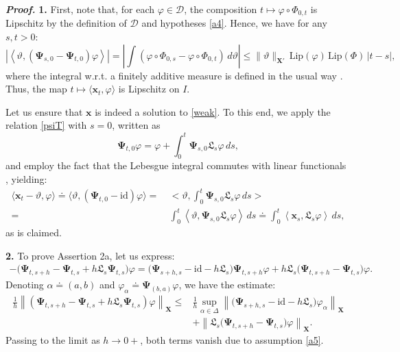 \documentclass[sn-mathphys-num]{sn-jnl}
\numberwithin{equation}{section}
\theoremstyle{mythm}
\theoremstyle{mydef}
\renewenvironment{proof}{\smallskip\noindent\emph{\textbf{Proof.}}%
  \hspace{1pt}}{\hspace{-5pt}{\nobreak\quad\nobreak\hfill\nobreak%
    $\square$\vspace{2pt}\par}\smallskip\goodbreak}
\newcommand{\Lip}{\mathrm{Lip}}
\renewcommand{\phi}{\varphi}
\renewcommand{\d}{\,d}
\newcommand{\id}{\mathrm{id}}
\begin{document}
\begin{proof}
  \textbf{1.} First, note that, for each \( \phi \in \bm{\mathcal D} \), 
 the composition \( t \mapsto \phi \circ \Phi_{0, t} \) is Lipschitz by the definition of \( \bm{\mathcal D} \) and hypotheses \ref{a4}. Hence, we have for any \( s,t > 0 \):
\[
    \left|\left\langle \vartheta, (\bm \Psi_{s,0} - \bm \Psi_{t,0})\phi\right\rangle\right| = \left|\int \left(\phi\circ\Phi_{0,s} - \phi\circ\Phi_{0,t}\right)\d \vartheta\right| \leq \|\vartheta\|_{\bm X'} \, \Lip(\phi) \, \Lip(\Phi)\, |t-s|,
\]
where the integral w.r.t. a finitely additive measure is defined in the usual way \cite[\S 4.7(iv)]{bogachevMeasureTheoryVolume2007a}. Thus, the map \(t \mapsto \langle \bm{x}_t , \phi \rangle\) is Lipschitz on $I$.

Let us ensure that \( \bm x \) is indeed a solution to \eqref{weak}. To this end, we apply the relation \eqref{psiT} with $s=0$, written as
\[
\bm \Psi_{t,0} \phi = \phi + \int_0^t \bm \Psi_{s,0} \mathfrak L_s \phi\d s,
\]  
and employ the fact that the Lebesgue integral commutes with linear functionals \cite[Sec.~8, Propos.~7]{dinculeanu2014vector}, yielding:
\begin{align*}
\langle \bm x_t-  \vartheta, \phi\rangle \doteq \langle\vartheta,(\bm \Psi_{t,0}-\id)\phi \rangle = \ &  \Big< \vartheta, \int_0^t \bm \Psi_{s,0} \mathfrak L_s \phi \d s \Big>\\
 = \  & \int_0^t \left\langle \vartheta, \bm \Psi_{s,0} \mathfrak L_s \phi\right\rangle \d s \doteq \int_0^{t}\left< \bm x_s,  \mathfrak L_s \phi\right> \d s,
\end{align*}
as is claimed.

\smallskip

\textbf{2.} To prove Assertion 2a, let us express:
    \begin{align*}
        -\big(\bm \Psi_{t, s+h} - \bm \Psi_{t,s} + h\mathfrak L_s \bm \Psi_{t,s}\big)\phi = \big(\bm \Psi_{s+h,s}  {-} \id  - h\mathfrak L_s\big)\bm \Psi_{t,s+h}\phi + h\mathfrak L_s \big(\bm \Psi_{t, s+h} - \bm \Psi_{t, s}\big)\phi.
    \end{align*}
   Denoting  $\alpha \doteq (a,b)$ and $\phi_\alpha \doteq \bm \Psi_{(b,a)}\phi$, we have the estimate:
      \begin{align*}
       \frac{1}{h}\left\|(\bm \Psi_{t, s+h} - \bm \Psi_{t,s} + h\mathfrak L_s \bm \Psi_{t,s})\phi\right\|_{\bm X}  \leq & \frac{1}{h}\sup_{\alpha \in \Delta}\left\|\big(\bm \Psi_{s+h,s}  - \id  - h\mathfrak L_s\big)\phi_\alpha\right\|_{\bm X}\\ 
       & +\left\|\mathfrak L_s \big(\bm \Psi_{t, s+h} - \bm \Psi_{t, s}\big)\phi\right\|_{\bm X}.
    \end{align*}
   Passing to the limit as $h \to 0+$, both terms vanish due to assumption \ref{a5}.


\end{proof}
\end{document}
